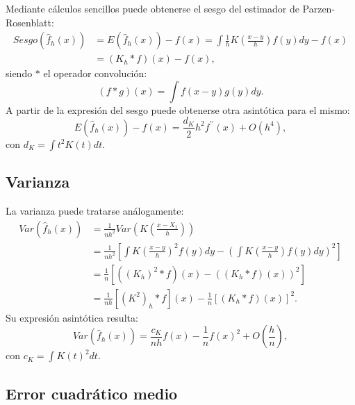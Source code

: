 \documentclass[]{book}
\theoremstyle{definition}
\theoremstyle{definition}
\theoremstyle{definition}
\theoremstyle{remark}
\begin{document}
Mediante cálculos sencillos puede obtenerse el sesgo del estimador de
Parzen-Rosenblatt: \[\begin{aligned}
Sesgo\left( \hat{f}_{h}\left( x \right) \right) &= E\left( \hat{f}_{h}\left(
x \right) \right) -f\left( x \right) =\int \frac{1}{h}K\left( \frac{x-y}{h}
 \right) f\left( y \right) dy-f\left( x \right) \\
&= \left( K_{h}\ast f \right) \left( x \right) -f\left( x \right),
\end{aligned}\] siendo \(\ast\) el operador convolución:
\[\left( f\ast g \right) \left( x \right) 
= \int f\left( x-y \right) g\left( y \right) dy.\] A partir de la
expresión del sesgo puede obtenerse otra asintótica para el mismo:
\[E\left( \hat{f}_{h}\left( x \right) \right) -f\left( x \right) =\frac{d_{K}}{2}
h^2f^{\prime \prime }\left( x \right) +O\left( h^{4} \right),\]con
\(d_{K}=\int t^2K\left( t \right) dt\).

\subsection{Varianza}\label{varianza}

La varianza puede tratarse análogamente: \[\begin{aligned}
Var\left( \hat{f}_{h}\left( x \right) \right) &= \frac{1}{nh^2}Var\left(
K\left( \frac{x-X_1}{h} \right) \right) \\
&= \frac{1}{nh^2}\left[ \int K\left( \frac{x-y}{h} \right)^2f\left(
y \right) dy-\left( \int K\left( \frac{x-y}{h} \right) f\left( y \right)
dy \right)^2\right] \\
&= \frac{1}{n}\left[ \left( \left( K_{h} \right)^2\ast f \right) \left(
x \right) -\left( \left( K_{h}\ast f \right) \left( x \right) \right)^2
\right] \\
&= \frac{1}{nh}\left[ \left( K^2 \right) _{h}\ast f\right] \left( x \right) -
\frac{1}{n}\left[ \left( K_{h}\ast f \right) \left( x \right) \right]^2.\end{aligned}\]Su
expresión asintótica resulta:
\[Var\left( \hat{f}_{h}\left( x \right) \right) =\frac{c_{K}}{nh}f\left(
x \right) - \frac{1}{n}f\left( x \right)^2 + O\left( \frac{h}{n} \right),\]
con \(c_{K}=\int K\left( t \right)^2dt\).

\subsection{Error cuadrático medio}\label{error-cuadratico-medio}
\end{document}
